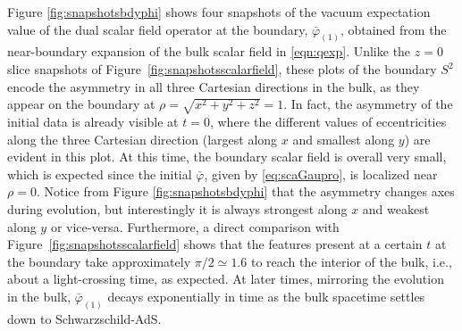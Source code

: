 \documentclass[aps,letterpaper,twocolumn,nofootinbib]{revtex4}
\numberwithin{equation}{section}
\begin{document}
Figure \ref{fig:snapshotsbdyphi} shows four snapshots of the vacuum expectation value of the dual scalar field operator at the boundary, $\bar{\varphi}_{(1)}$, obtained from the near-boundary expansion of the bulk scalar field in \eqref{eqn:qexp}.
Unlike the $z=0$ slice snapshots of Figure~\ref{fig:snapshotsscalarfield}, these plots of the boundary $S^2$ encode the asymmetry in all three Cartesian directions in the bulk, as they appear on the boundary at $\rho = \sqrt{x^2+y^2+z^2}=1$. 
In fact, the asymmetry of the initial data is already visible at $t=0$, where the different values of eccentricities along the three Cartesian direction (largest along $x$ and smallest along $y$) are evident in this plot. At this time, the boundary scalar field is overall very small, which is expected since the initial $\bar{\varphi}$, given by \eqref{eq:scaGaupro}, is localized near $\rho=0$.
Notice from Figure \ref{fig:snapshotsbdyphi} that the asymmetry changes axes during evolution, but interestingly it is always strongest along $x$ and weakest along $y$ or vice-versa. Furthermore, a direct comparison with Figure~\ref{fig:snapshotsscalarfield} shows that the features present at a certain $t$ at the boundary take approximately $\pi/2\simeq1.6$ to reach the interior of the bulk, i.e., about a light-crossing time, as expected. At later times, mirroring the evolution in the bulk, $\bar{\varphi}_{(1)}$ decays exponentially in time as the bulk spacetime settles down to Schwarzschild-AdS.
\end{document}

